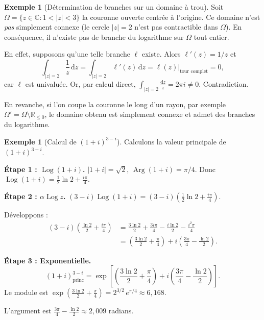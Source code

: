 \documentclass[12pt,a4paper,openany]{book}
\theoremstyle{definition}
\newtheorem{exemple}[definition]{Exemple}
\theoremstyle{plain}
\theoremstyle{remark}
\newcommand{\C}{\mathbb{C}}
\newcommand{\R}{\mathbb{R}}
\DeclareMathOperator{\Arg}{Arg}
\DeclareMathOperator{\Log}{Log}
\newcommand{\dd}{\mathrm{d}}
\newcommand{\abs}[1]{\left|#1\right|}
\begin{document}
\begin{exemple}[Détermination de branches sur un domaine à trou]\label{ex:branche-domaine-trou}
Soit $\Omega = \{z \in \C : 1 < \abs{z} < 3\}$ la couronne ouverte centrée à l'origine.
Ce domaine n'est \emph{pas} simplement connexe (le cercle $\abs{z} = 2$ n'est pas
contractible dans $\Omega$). En conséquence, il n'existe pas de branche du logarithme
sur $\Omega$ tout entier.

En effet, supposons qu'une telle branche $\ell$ existe. Alors $\ell'(z) = 1/z$ et
\[
  \int_{\abs{z}=2} \frac{1}{z}\,\dd z = \int_{\abs{z}=2} \ell'(z)\,\dd z = \ell(z)\Big|_{\text{tour complet}} = 0,
\]
car $\ell$ est univaluée. Or, par calcul direct,
$\int_{\abs{z}=2} \frac{\dd z}{z} = 2\pi i \neq 0$. Contradiction.

En revanche, si l'on coupe la couronne le long d'un rayon, par exemple
$\Omega' = \Omega \setminus \R_{\leq 0}$, le domaine obtenu est simplement connexe et
admet des branches du logarithme.
\end{exemple}

\begin{exemple}[Calcul de $(1+i)^{3-i}$]\label{ex:puissance-complexe-detaillee}
Calculons la valeur principale de $(1+i)^{3-i}$.

\textbf{Étape 1 : $\Log(1+i)$.}
$\abs{1+i} = \sqrt{2}$, $\Arg(1+i) = \pi/4$. Donc
$\Log(1+i) = \frac{1}{2}\ln 2 + \frac{i\pi}{4}$.

\textbf{Étape 2 : $\alpha \Log z$.}
$(3-i)\Log(1+i) = (3-i)\left(\frac{1}{2}\ln 2 + \frac{i\pi}{4}\right)$.

Développons :
\begin{align*}
  (3-i)\left(\frac{\ln 2}{2} + \frac{i\pi}{4}\right)
  &= \frac{3\ln 2}{2} + \frac{3i\pi}{4} - \frac{i\ln 2}{2} - \frac{i^2\pi}{4} \\
  &= \left(\frac{3\ln 2}{2} + \frac{\pi}{4}\right)
     + i\left(\frac{3\pi}{4} - \frac{\ln 2}{2}\right).
\end{align*}

\textbf{Étape 3 : Exponentielle.}
\[
  (1+i)^{3-i}_{\mathrm{princ}} = \exp\!\left[\left(\frac{3\ln 2}{2} + \frac{\pi}{4}\right)
  + i\left(\frac{3\pi}{4} - \frac{\ln 2}{2}\right)\right].
\]
Le module est
$\exp\!\left(\frac{3\ln 2}{2} + \frac{\pi}{4}\right) = 2^{3/2}\,e^{\pi/4} \approx 6{,}168$.

L'argument est $\frac{3\pi}{4} - \frac{\ln 2}{2} \approx 2{,}009$ radians.
\end{exemple}
\end{document}
